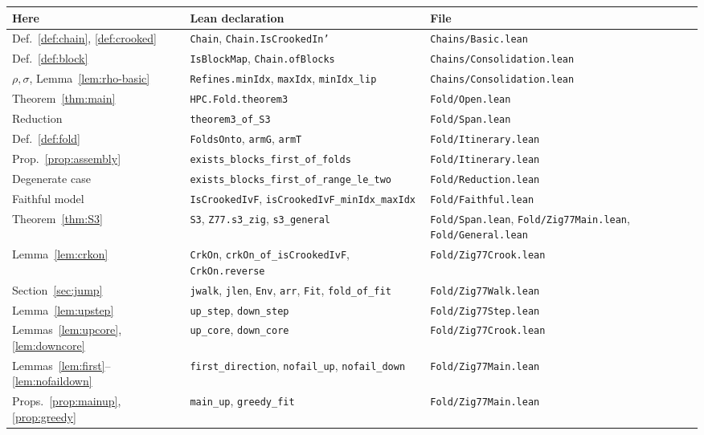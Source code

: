 \documentclass[11pt]{article}
\theoremstyle{definition}
\theoremstyle{remark}
\newcommand{\lean}[1]{\texttt{#1}}
\begin{document}
\begin{center}
\footnotesize
\begin{tabular}{@{}p{3.1cm}p{7.4cm}p{4.3cm}@{}}
\toprule
Here & Lean declaration & File\\
\midrule
Def.~\ref{def:chain}, \ref{def:crooked} & \lean{Chain}, \lean{Chain.IsCrookedIn'} & \lean{Chains/Basic.lean}\\
Def.~\ref{def:block} & \lean{IsBlockMap}, \lean{Chain.ofBlocks} & \lean{Chains/Consolidation.lean}\\
$\rho,\sigma$, Lemma~\ref{lem:rho-basic} & \lean{Refines.minIdx}, \lean{maxIdx}, \lean{minIdx\_lip} & \lean{Chains/Consolidation.lean}\\
Theorem~\ref{thm:main} & \lean{HPC.Fold.theorem3} & \lean{Fold/Open.lean}\\
Reduction & \lean{theorem3\_of\_S3} & \lean{Fold/Span.lean}\\
Def.~\ref{def:fold} & \lean{FoldsOnto}, \lean{armG}, \lean{armT} & \lean{Fold/Itinerary.lean}\\
Prop.~\ref{prop:assembly} & \lean{exists\_blocks\_first\_of\_folds} & \lean{Fold/Itinerary.lean}\\
Degenerate case & \lean{exists\_blocks\_first\_of\_range\_le\_two} & \lean{Fold/Reduction.lean}\\
Faithful model & \lean{IsCrookedIvF}, \lean{isCrookedIvF\_minIdx\_maxIdx} & \lean{Fold/Faithful.lean}\\
Theorem~\ref{thm:S3} & \lean{S3}, \lean{Z77.s3\_zig}, \lean{s3\_general} & \lean{Fold/Span.lean}, \lean{Fold/Zig77Main.lean}, \lean{Fold/General.lean}\\
Lemma~\ref{lem:crkon} & \lean{CrkOn}, \lean{crkOn\_of\_isCrookedIvF}, \lean{CrkOn.reverse} & \lean{Fold/Zig77Crook.lean}\\
Section~\ref{sec:jump} & \lean{jwalk}, \lean{jlen}, \lean{Env}, \lean{arr}, \lean{Fit}, \lean{fold\_of\_fit} & \lean{Fold/Zig77Walk.lean}\\
Lemma~\ref{lem:upstep} & \lean{up\_step}, \lean{down\_step} & \lean{Fold/Zig77Step.lean}\\
Lemmas~\ref{lem:upcore}, \ref{lem:downcore} & \lean{up\_core}, \lean{down\_core} & \lean{Fold/Zig77Crook.lean}\\
Lemmas~\ref{lem:first}--\ref{lem:nofaildown} & \lean{first\_direction}, \lean{nofail\_up}, \lean{nofail\_down} & \lean{Fold/Zig77Main.lean}\\
Props.~\ref{prop:mainup}, \ref{prop:greedy} & \lean{main\_up}, \lean{greedy\_fit} & \lean{Fold/Zig77Main.lean}\\
\bottomrule
\end{tabular}
\end{center}
\end{document}
